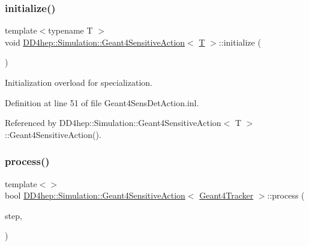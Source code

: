 \hypertarget{class_d_d4hep_1_1_simulation_1_1_geant4_sensitive_action_a6f4a254db9610da9e0a9b8c0a66a20da}{}\label{class_d_d4hep_1_1_simulation_1_1_geant4_sensitive_action_a6f4a254db9610da9e0a9b8c0a66a20da} 
\subsubsection{\texorpdfstring{initialize()}{initialize()}\hspace{0.1cm}{\footnotesize\ttfamily [3/3]}}
{\footnotesize\ttfamily template$<$typename T $>$ \\
void \hyperlink{class_d_d4hep_1_1_simulation_1_1_geant4_sensitive_action}{D\+D4hep\+::\+Simulation\+::\+Geant4\+Sensitive\+Action}$<$ \hyperlink{class_t}{T} $>$\+::initialize (\begin{DoxyParamCaption}{ }\end{DoxyParamCaption})\hspace{0.3cm}{\ttfamily [virtual]}}



Initialization overload for specialization. 



Definition at line 51 of file Geant4\+Sens\+Det\+Action.\+inl.



Referenced by D\+D4hep\+::\+Simulation\+::\+Geant4\+Sensitive\+Action$<$ T $>$\+::\+Geant4\+Sensitive\+Action().

\hypertarget{class_d_d4hep_1_1_simulation_1_1_geant4_sensitive_action_a2fa425bb9c1d9bc1276fcac2fd86984d}{}\label{class_d_d4hep_1_1_simulation_1_1_geant4_sensitive_action_a2fa425bb9c1d9bc1276fcac2fd86984d} 
\subsubsection{\texorpdfstring{process()}{process()}\hspace{0.1cm}{\footnotesize\ttfamily [1/7]}}
{\footnotesize\ttfamily template$<$$>$ \\
bool \hyperlink{class_d_d4hep_1_1_simulation_1_1_geant4_sensitive_action}{D\+D4hep\+::\+Simulation\+::\+Geant4\+Sensitive\+Action}$<$ \hyperlink{class_d_d4hep_1_1_simulation_1_1_geant4_tracker}{Geant4\+Tracker} $>$\+::process (\begin{DoxyParamCaption}\item[{G4\+Step $\ast$}]{step,  }\item[{G4\+Touchable\+History $\ast$}]{ }\end{DoxyParamCaption})\hspace{0.3cm}{\ttfamily [virtual]}}



